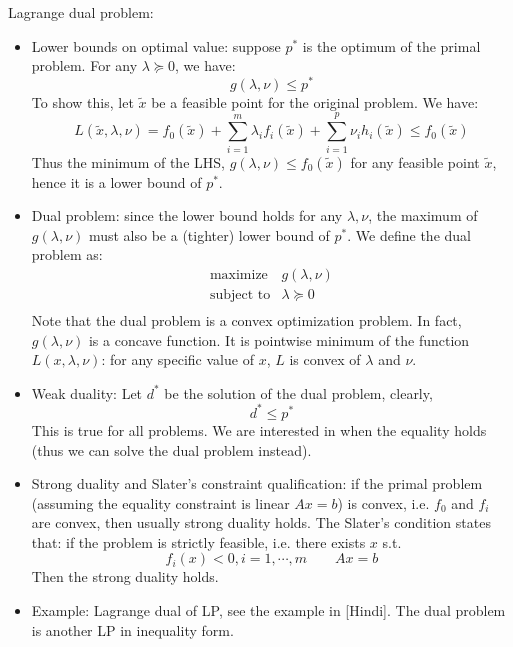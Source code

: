 \documentclass{report}
\begin{document}
Lagrange dual problem: 
\begin{itemize}
\item Lower bounds on optimal value: suppose $p^*$ is the optimum of the primal problem. For any $\lambda \succeq 0$, we have:
\begin{equation}
g(\lambda, \nu) \leq p^*	
\end{equation}
To show this, let $\tilde{x}$ be a feasible point for the original problem. We have: 
\begin{equation}
L(\tilde{x},\lambda,\nu) = f_0(\tilde{x}) + \sum_{i=1}^m \lambda_i f_i(\tilde{x}) + \sum_{i=1}^p \nu_i h_i(\tilde{x}) \leq f_0(\tilde{x})
\end{equation}
Thus the minimum of the LHS, $g(\lambda,\nu) \leq f_0(\tilde{x})$ for any feasible point $\tilde{x}$, hence it is a lower bound of $p^*$. 

\item Dual problem: since the lower bound holds for any $\lambda, \nu$, the maximum of $g(\lambda, \nu)$ must also be a (tighter) lower bound of $p^*$. We define the dual problem as: 
\begin{equation}
\begin{array}{ll}
\text{maximize} & g(\lambda,\nu) \\
\text{subject to} & \lambda \succeq 0\\
\end{array}	
\end{equation}
Note that the dual problem is a convex optimization problem. In fact, $g(\lambda, \nu)$ is a concave function. It is pointwise minimum of the function $L(x,\lambda,\nu)$: for any specific value of $x$, $L$ is convex of $\lambda$ and $\nu$. 

\item Weak duality: Let $d^*$ be the solution of the dual problem, clearly, 
\begin{equation}
d^* \leq p^*	
\end{equation}
This is true for all problems. We are interested in when the equality holds (thus we can solve the dual problem instead). 

\item Strong duality and Slater's constraint qualification: if the primal problem (assuming the equality constraint is linear $Ax =b$) is convex, i.e. $f_0$ and $f_i$ are convex, then usually strong duality holds. The Slater's condition states that: if the problem is strictly feasible, i.e. there exists $x$ s.t. 
\begin{equation}
f_i(x) < 0, i = 1, \cdots, m \qquad Ax = b	
\end{equation}
Then the strong duality holds. 

\item Example: Lagrange dual of LP, see the example in [Hindi]. The dual problem is another LP in inequality form. 
\end{itemize}
\end{document}
